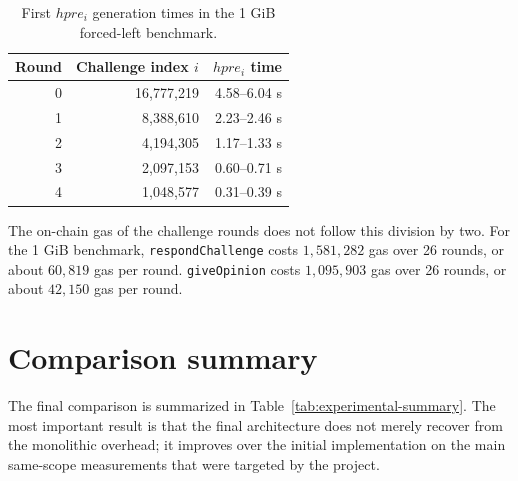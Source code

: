 \begin{table}[htbp]
  \centering
  \begin{tabular}{rrr}
    \toprule
    Round & Challenge index \(i\) & \(hpre_i\) time \\
    \midrule
    0 & 16,777,219 & 4.58--6.04 s \\
    1 & 8,388,610 & 2.23--2.46 s \\
    2 & 4,194,305 & 1.17--1.33 s \\
    3 & 2,097,153 & 0.60--0.71 s \\
    4 & 1,048,577 & 0.31--0.39 s \\
    \bottomrule
  \end{tabular}
  \caption{First \(hpre_i\) generation times in the 1 GiB forced-left benchmark.}
  \label{tab:hpre-first-rounds}
\end{table}

The on-chain gas of the challenge rounds does not follow this division by two. For the
1 GiB benchmark, \texttt{respondChallenge} costs \(1,581,282\) gas over 26 rounds, or about
\(60,819\) gas per round. \texttt{giveOpinion} costs \(1,095,903\) gas over 26 rounds, or
about \(42,150\) gas per round.

\section{Comparison summary}

The final comparison is summarized in Table~\ref{tab:experimental-summary}. The most
important result is that the final architecture does not merely recover from the
monolithic overhead; it improves over the initial implementation on the main same-scope
measurements that were targeted by the project.

